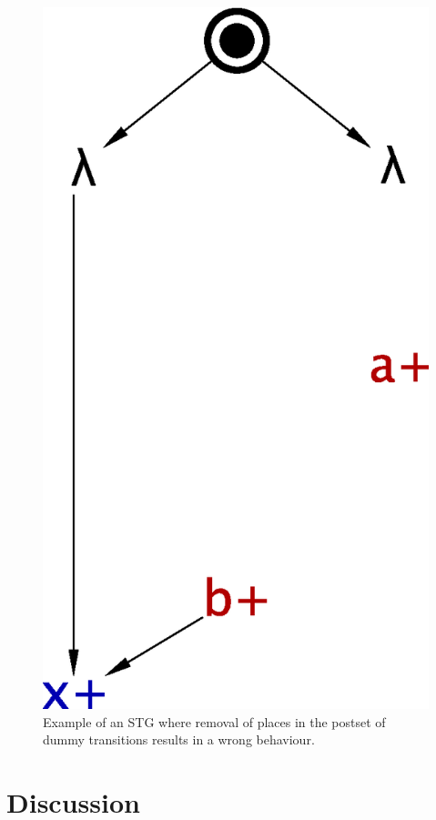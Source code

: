 \begin{figure}[!tb]
    \includegraphics[scale=0.3]{EXPERIMENTS/stg/dummy_counterexample_removed}%
    \hfill%
    {}
    \caption[Example of invalid place removal]{\label{fi-dummy-counterexample}
        Example of an STG where removal of places in the postset of dummy transitions results in a wrong behaviour.
    }
\end{figure}

\section{Discussion}

